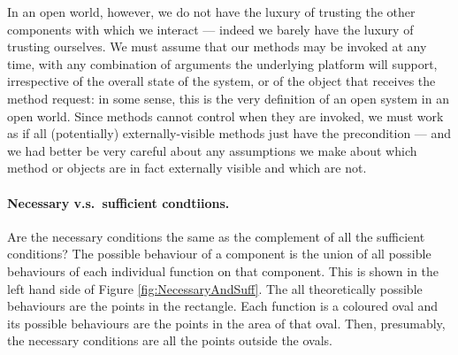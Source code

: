 In an open world, however, we do not have the luxury of trusting the
other components with which we interact --- indeed we barely have the
luxury of trusting ourselves.  We must assume that our methods may be
invoked at any time, with any combination of arguments the underlying
platform will support, irrespective of the overall state of the
system, or of the object that receives the method request: in some
sense, this is the very definition of an open system in an open world.
Since methods cannot control when they are invoked, we must work
as if all (potentially) externally-visible methods just have the precondition
 --- and we had better be very careful about any assumptions
we make about which method or objects are in fact externally visible
and which are not.  






\paragraph{Necessary v.s.\ sufficient condtiions.}

Are the necessary conditions the same as the complement of all the
sufficient conditions?  The possible behaviour of a component is the
union of all possible behaviours of each individual function on that
component.  This is shown in the left hand side of
Figure \ref{fig:NecessaryAndSuff}. The all theoretically possible
behaviours are the points in the rectangle.  Each function is a
coloured oval and its possible behaviours are the points in the area
of that oval.  Then, presumably, the necessary conditions are all the
points outside the ovals.

